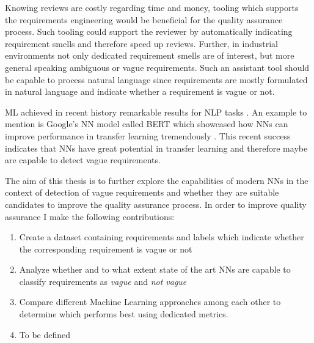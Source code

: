 Knowing reviews are costly regarding time and money, tooling which supports the requirements engineering would be beneficial for the quality assurance process.
Such tooling could support the reviewer by automatically indicating requirement smells and therefore speed up reviews.
Further, in industrial environments not only dedicated requirement smells are of interest, but more general speaking ambiguous or vague requirements.
Such an assistant tool should be capable to process natural language since requirements are mostly formulated in natural language \parencite{Mich:2004} and indicate whether a requirement is vague or not.

\Ac{ML} achieved in recent history remarkable results for \ac{NLP} tasks \parencite{Khan:2016}.
An example to mention is Google's \ac{NN} model called BERT which showcased how \acp{NN} can improve performance in transfer learning tremendously \parencite{Devlin:2018}.
This recent success indicates that \acp{NN} have great potential in transfer learning and therefore maybe are capable to detect vague requirements.

The aim of this thesis is to further explore the capabilities of modern \acp{NN} in the context of detection of vague requirements and whether they are suitable candidates to improve the quality assurance process.
In order to improve quality assurance I make the following contributions:
\begin{enumerate}
    \item Create a dataset containing requirements and labels which indicate whether the corresponding requirement is vague or not
    \item Analyze whether and to what extent state of the art \acp{NN} are capable to classify requirements as \textit{vague} and \textit{not vague}
    \item Compare different Machine Learning approaches among each other to determine which performs best using dedicated metrics.
    \item To be defined
\end{enumerate}
